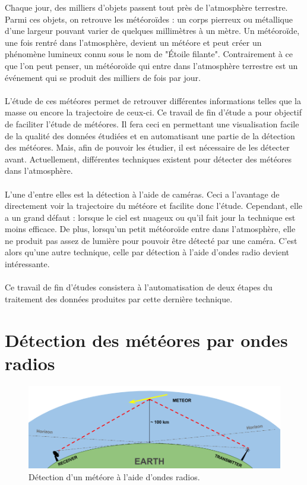 \documentclass[11pt]{article}
\begin{document}
Chaque jour, des milliers d'objets passent tout près de l'atmosphère terrestre.
Parmi ces objets, on retrouve les météoroïdes : un corps pierreux ou métallique d'une largeur pouvant varier de quelques millimètres à un mètre.
Un météoroïde, une fois rentré dans l'atmosphère, devient un météore et peut créer un phénomène lumineux connu sous le nom de "Étoile filante".
Contrairement à ce que l'on peut penser, un météoroïde qui entre dans l'atmosphère terrestre est un événement qui se produit des milliers de fois par jour.
\\
\\
L'étude de ces météores permet de retrouver différentes informations telles que la masse ou encore la trajectoire de ceux-ci.
Ce travail de fin d'étude a pour objectif de faciliter l'étude de météores.
Il fera ceci en permettant une visualisation facile de la qualité des données étudiées et en automatisant une partie de la détection des météores.
Mais, afin de pouvoir les étudier, il est nécessaire de les détecter avant.
Actuellement, différentes techniques existent pour détecter des météores dans l'atmosphère.
\\
\\
L'une d'entre elles est la détection à l'aide de caméras.
Ceci a l'avantage de directement voir la trajectoire du météore et facilite donc l'étude.
Cependant, elle a un grand défaut : lorsque le ciel est nuageux ou qu'il fait jour la technique est moins efficace.
De plus, lorsqu'un petit météoroïde entre dans l'atmosphère, elle ne produit pas assez de lumière pour pouvoir être détecté par une caméra.
C'est alors qu'une autre technique, celle par détection à l'aide d'ondes radio devient intéressante.
\\
\\
Ce travail de fin d'études consistera à l'automatisation de deux étapes du traitement des données produites par cette dernière technique.

\newpage

\section{Détection des météores par ondes radios}

\begin{figure}[t]
    \begin{center}
        \includegraphics[scale=0.37]{ForwardScatter_principle.png}
        \caption{Détection d'un météore à l'aide d'ondes radios.}
        \label{fig:forward_scatt}
    \end{center}
\end{figure}
\end{document}
